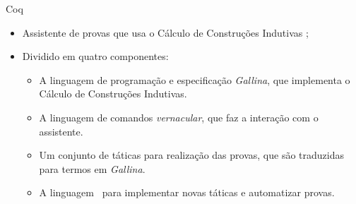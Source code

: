 \begin{frame}{Coq}
    \begin{itemize}
        \item Assistente de provas que usa o Cálculo de Construções Indutivas \cite{bertot2013interactive};
        \item Dividido em quatro componentes:
        \begin{itemize}
            \item A linguagem de programação e especificação \textit{Gallina}, que implementa o Cálculo de Construções Indutivas.
            \item A linguagem de comandos \textit{vernacular}, que faz a interação com o assistente.
            \item Um conjunto de táticas para realização das provas, que são traduzidas para termos em \textit{Gallina}.
            \item A linguagem \Ltac\ para implementar novas táticas e automatizar provas.
        \end{itemize}
    \end{itemize}
\end{frame}